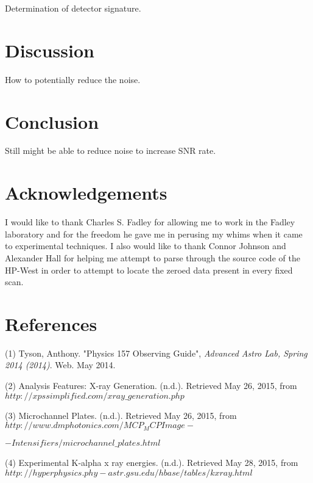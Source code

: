 \documentclass[twoside]{article}
\renewcommand{\label}[1]{}
\begin{document}
\begin{multicols}{2}
\vspace{5mm}

Determination of detector signature. 




\section{Discussion}

How to potentially reduce the noise.

\section{Conclusion}

Still might be able to reduce noise to increase SNR rate.

\section{Acknowledgements}


I would like to thank Charles S. Fadley for allowing me to work in the Fadley laboratory and for the freedom he gave me in perusing my whims when it came to experimental techniques.  I also would like to thank Connor Johnson and Alexander Hall for helping me attempt to parse through the source code of the HP-West in order to attempt to locate the zeroed data present in every fixed scan. 

\section{References}

(1) Tyson, Anthony. "Physics 157 Observing Guide", \textit{Advanced Astro Lab, Spring 2014 (2014)}. Web. May 2014.


(2)  Analysis Features: X-ray Generation. (n.d.). Retrieved May 26, 2015, from 
$http://xpssimplified.com/xray\_generation.php$  


(3)  Microchannel Plates. (n.d.). Retrieved May 26, 2015, from $http://www.dmphotonics.com/MCP_MCPImage-$

$-Intensifiers/microchannel\_plates.html$


(4)  Experimental K-alpha x ray energies. (n.d.). Retrieved May 28, 2015, from 
$http://hyperphysics.phy-astr.gsu.edu/hbase/tables/kxray.html$

\end{multicols}
\end{document}

